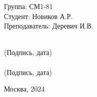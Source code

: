 \vspace{3cm}
\begin{flushright}
    \begin{minipage}{0.6\linewidth}
        \begin{flushleft}
            Группа: СМ1-81
            \\
            Студент: Новиков А.Р.
            \\
            \vspace{3ex}
            Преподаватель: Деревич И.В.
        \end{flushleft}
    \end{minipage}
    \begin{minipage}{0.3\linewidth}
        \begin{center}
            \vspace{9ex}
            \underline{\hspace{5cm}} 
            \\
            \footnotesize (Подпись, дата)
            \\[10pt]
            \underline{\hspace{5cm}} 
            \\
            \footnotesize (Подпись, дата)
        \end{center}
    \end{minipage}
\end{flushright}
\begin{table}[b]
    \center Москва, 2024
\end{table}
\thispagestyle{empty}